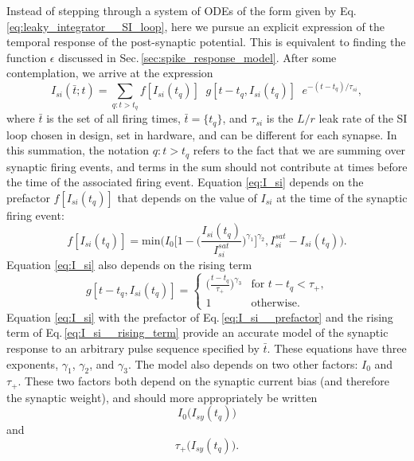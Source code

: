 \documentclass[]{article}
\begin{document}
Instead of stepping through a system of ODEs of the form given by Eq.\,\ref{eq:leaky_integrator__SI_loop}, here we pursue an explicit expression of the temporal response of the post-synaptic potential. This is equivalent to finding the function $\epsilon$ discussed in Sec.\,\ref{sec:spike_response_model}. After some contemplation, we arrive at the expression
\begin{equation}
\label{eq:I_si}
I_{si}(\bar{t};t) = \sum_{q: t>t_{q}} f[I_{si}(t_{q})]\phantom{a}g[t-t_q,I_{si}(t_{q})]\phantom{a}e^{-(t-t_{q})/\tau_{si}},
\end{equation}
where $\bar{t}$ is the set of all firing times, $\bar{t} = \{t_q\}$, and $\tau_{si}$ is the $L/r$ leak rate of the SI loop chosen in design, set in hardware, and can be different for each synapse. In this summation, the notation $q:t>t_q$ refers to the fact that we are summing over synaptic firing events, and terms in the sum should not contribute at times before the time of the associated firing event. Equation \ref{eq:I_si} depends on the prefactor $f[I_{si}(t_q)]$ that depends on the value of $I_{si}$ at the time of the synaptic firing event:
\begin{equation}
\label{eq:I_si__prefactor}
f[I_{si}(t_q)] = \mathrm{min}\bigg(I_0\bigg[1-\bigg(\frac{I_{si}(t_q)}{I_{si}^{sat}}\bigg)^{\gamma_1}\bigg]^{\gamma_2},I_{si}^{sat}-I_{si}(t_q)\bigg).
\end{equation}
Equation \ref{eq:I_si} also depends on the rising term
\begin{equation}
\label{eq:I_si__rising_term}
g[t-t_q,I_{si}(t_q)]= 
\begin{cases}
   \bigg(\frac{t-t_q}{\tau_+}\bigg)^{\gamma_3} & \text{for }t-t_q<\tau_+\text{,}\\
    1              & \text{otherwise.}
\end{cases}
\end{equation}
Equation \ref{eq:I_si} with the prefactor of Eq.\,\ref{eq:I_si__prefactor} and the rising term of Eq.\,\ref{eq:I_si__rising_term} provide an accurate model of the synaptic response to an arbitrary pulse sequence specified by $\bar{t}$. These equations have three exponents, $\gamma_1$, $\gamma_2$, and $\gamma_3$. The model also depends on two other factors: $I_0$ and $\tau_+$. These two factors both depend on the synaptic current bias (and therefore the synaptic weight), and should more appropriately be written 
\begin{equation}
I_0\big(I_{sy}(t_q)\big)
\end{equation}
and 
\begin{equation}
\tau_+\big(I_{sy}(t_q)\big).
\end{equation}
\end{document}
